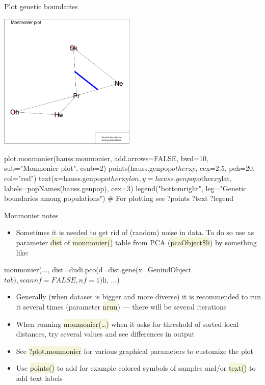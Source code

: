 \documentclass[compress, xelatex, 11pt, xcolor=svgnames, aspectratio=169,
	hyperref={
		bookmarks=true,
		unicode=true,
		colorlinks=true,
		pdftitle={Molecular data in R},
		plainpages=false,
		pdfauthor={Vojtech Zeisek},
		pdfsubject={Course about phylogeny and evolution in R},
		pdfcreator={XeLaTeX},
		pdfkeywords={R, evolution, phylogeny, molecular data},
		linkcolor=Crimson, %
		anchorcolor=Magenta, %
		citecolor=Magenta, %
		filecolor=Magenta, %
		menucolor=Magenta, %
		urlcolor=DodgerBlue, %
		},
	url={hyphens, lowtilde} %
	]{beamer}
\renewcommand{\texttt}[1]{\colorbox{Beige}{{\ttfamily #1}}}
\begin{document}
\begin{frame}[fragile]{Plot genetic boundaries}
	\begin{multicols}{2}
		\begin{center}
			\includegraphics[height=6.5cm]{monmonier.png}
		\end{center}
		\begin{spluscode}
    plot.monmonier(hauss.monmonier,
      add.arrows=FALSE, bwd=10,
      sub="Monmonier plot", csub=2)
    points(hauss.genpop$other$xy,
      cex=2.5, pch=20, col="red")
    text(x=hauss.genpop$other$xy$lon,
      y=hauss.genpop$other$xy$lat,
      labels=popNames(hauss.genpop),
      cex=3)
    legend("bottomright",
      leg="Genetic boundaries\n
      among populations")
    # For plotting see
    ?points
    ?text
    ?legend
		\end{spluscode}
	\end{multicols}
\end{frame}

\begin{frame}[fragile]{Monmonier notes}
	\begin{itemize}
		\item Sometimes it is needed to get rid of (random) noise in data. To do so use as parameter \texttt{dist} of \texttt{monmonier()} table from PCA (\texttt{pcaObject\$li}) by something like:
	\end{itemize}
	\begin{spluscode}
    monmonier(..., dist=dudi.pco(d=dist.gene(x=GenindObject$tab),
      scannf=FALSE, nf=1)$li, ...)
	\end{spluscode}
	\begin{itemize}
		\item Generally (when dataset is bigger and more diverse) it is recommended to run it several times (parameter \texttt{nrun}) --- there will be several iterations
		\item When running \texttt{monmonier(\ldots)} when it asks for threshold of sorted local distances, try several values and see differences in output
		\item See \texttt{?plot.monmonier} for various graphical parameters to customize the plot
		\item Use \texttt{points()} to add for example colored symbols of samples and/or \texttt{text()} to add text labels
	\end{itemize}
\end{frame}
\end{document}
